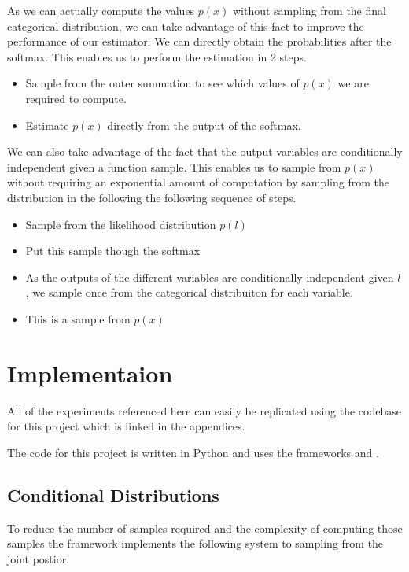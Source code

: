 \documentclass[12pt, a4paper]{report}
\theoremstyle{definition}
\begin{document}
As we can actually compute the values $p(x)$ without sampling from the final categorical distribution, we can take advantage of this fact to improve the performance of our estimator. We can directly obtain the probabilities after the softmax. This enables us to perform the estimation in 2 steps.

\begin{itemize}
    \item Sample from the outer summation to see which values of $p(x)$ we are required to compute.
    \item Estimate $p(x)$ directly from the output of the softmax.
\end{itemize}

We can also take advantage of the fact that the output variables are conditionally independent given a function sample. This enables us to sample from $p(x)$ without requiring an exponential amount of computation by sampling from the distribution in the following the following sequence of steps.

\begin{itemize}
    \item Sample from the likelihood distribution $p(l)$
    \item Put this sample though the softmax
    \item As the outputs of the different variables are conditionally independent given $l$, we sample once from the categorical distribuiton for each variable.
    \item This is a sample from $p(x)$
\end{itemize}



\chapter{Implementaion}
\label{Chap6}

All of the experiments referenced here can easily be replicated using the codebase for this project which is linked in the appendices.

The code for this project is written in Python and uses the frameworks \cite[Pytorch]{NEURIPS2019_9015} and \cite[GPytorch]{gardner2018gpytorch}.


\section{Conditional Distributions}
To reduce the number of samples required and the complexity of computing those samples the framework implements the following system to sampling from the joint postior.
\end{document}
